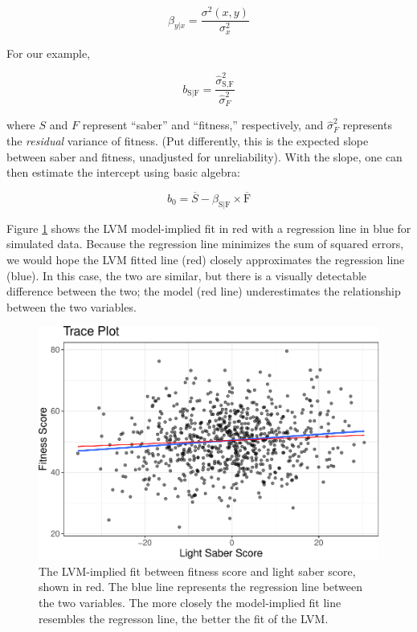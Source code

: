 \documentclass[
  english,
  doc]{apa6}
\begin{document}
\[\beta_{y|x} = \frac{\sigma^2(x,y)}{\sigma^2_x}\]

For our example,

\[b_{\text{S}|\text{F}} = \frac{\hat{\sigma}^2_{\text{S},\text{F}}}{\hat{\sigma}^2_F}\]

\noindent where \(S\) and \(F\) represent ``saber'' and ``fitness,'' respectively, and \({\hat{\sigma}^2_F}\) represents the \emph{residual} variance of fitness. (Put differently, this is the expected slope between saber and fitness, unadjusted for unreliability). With the slope, one can then estimate the intercept using basic algebra:

\[b_0=\overline{S}-\beta_{\text{S}|\text{F}}\times \overline{\text{F}}\]

Figure \ref{fig:trace1} shows the LVM model-implied fit in red with a regression line in blue for simulated data. Because the regression line minimizes the sum of squared errors, we would hope the LVM fitted line (red) closely approximates the regression line (blue). In this case, the two are similar, but there is a visually detectable difference between the two; the model (red line) underestimates the relationship between the two variables.

\begin{figure}
\centering
\includegraphics{flexplavaan_draft_files/figure-latex/trace1-1.pdf}
\caption{\label{fig:trace1}The LVM-implied fit between fitness score and light saber score, shown in red. The blue line represents the regression line between the two variables. The more closely the model-implied fit line resembles the regresson line, the better the fit of the LVM.}
\end{figure}
\end{document}

